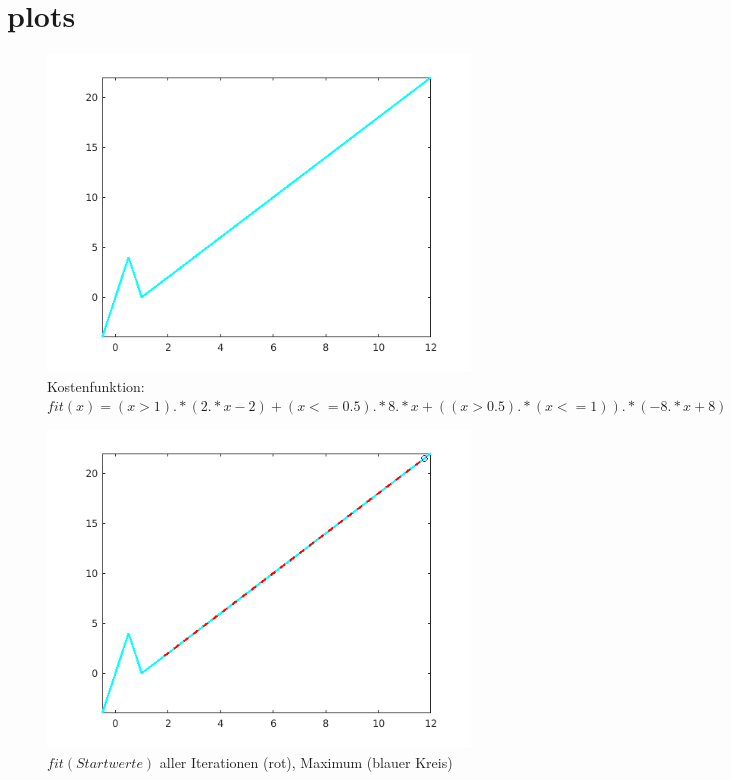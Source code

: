 \documentclass{hbrs-ecta-report}
\begin{document}
\FloatBarrier

\section{plots}
\begin{figure}[ht!]
	\includegraphics[width=\linewidth]{img/fit}
	\caption{Kostenfunktion: $fit(x) = (x>1).*(2.*x-2) + (x<=0.5).*8.*x + ((x>0.5).*(x<=1)).*(-8.*x + 8) $}
	\label{fig:fit}
\end{figure}

\begin{figure}[ht!]
\includegraphics[width=\linewidth]{img/plot_fit_max.png}
\caption{$fit(Startwerte)$ aller Iterationen (rot), Maximum \small(blauer Kreis)}
\label{fig:fit_max} 
\end{figure}
\end{document}
